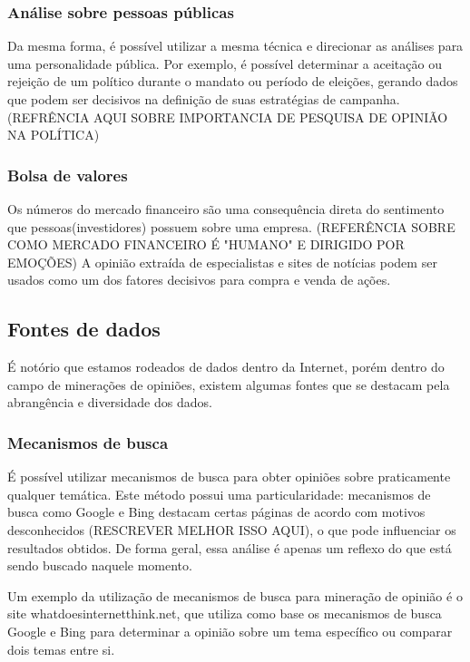 \subsubsection{Análise sobre pessoas públicas}

Da mesma forma, é possível utilizar a mesma técnica e direcionar as análises para uma personalidade pública. Por exemplo, é possível determinar a aceitação ou rejeição de um político durante o mandato ou período de eleições, gerando dados que podem ser decisivos na definição de suas estratégias de campanha. (REFRÊNCIA AQUI SOBRE IMPORTANCIA DE PESQUISA DE OPINIÃO NA POLÍTICA)

\subsubsection{Bolsa de valores}

Os números do mercado financeiro são uma consequência direta do sentimento que pessoas(investidores) possuem sobre uma empresa. (REFERÊNCIA SOBRE COMO MERCADO FINANCEIRO É "HUMANO" E DIRIGIDO POR EMOÇÕES) A opinião extraída de especialistas e sites de notícias podem ser usados como um dos fatores decisivos para compra e venda de ações.

\subsection{Fontes de dados}

É notório que estamos rodeados de dados dentro da Internet, porém dentro do campo de minerações de opiniões, existem algumas fontes que se destacam pela abrangência e diversidade dos dados.

\subsubsection{Mecanismos de busca}

É possível utilizar mecanismos de busca para obter opiniões sobre praticamente qualquer temática. Este método possui uma particularidade: mecanismos de busca como Google e Bing destacam certas páginas de acordo com motivos desconhecidos (RESCREVER MELHOR ISSO AQUI), o que pode influenciar os resultados obtidos. De forma geral, essa análise é apenas um reflexo do que está sendo buscado naquele momento.

Um exemplo da utilização de mecanismos de busca para mineração de opinião é o site whatdoesinternetthink.net\cite{whatdoesinternetthink}, que utiliza como base os mecanismos de busca Google e Bing para determinar a opinião sobre um tema específico ou comparar dois temas entre si.

